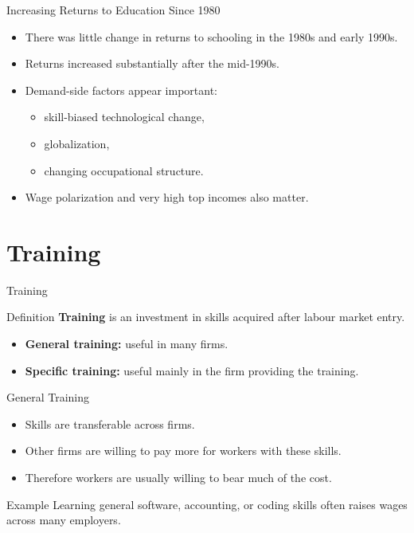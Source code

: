 \documentclass[aspectratio=169]{beamer}
\begin{document}
\begin{frame}{Increasing Returns to Education Since 1980}
\transfade
\begin{itemize}
  \item There was little change in returns to schooling in the 1980s and early 1990s.
  \item Returns increased substantially after the mid-1990s.
  \item Demand-side factors appear important:
  \begin{itemize}
    \item skill-biased technological change,
    \item globalization,
    \item changing occupational structure.
  \end{itemize}
  \item Wage polarization and very high top incomes also matter.
\end{itemize}
\end{frame}

\section{Training}

\begin{frame}{Training}
\transfade
\begin{block}{Definition}
\textbf{Training} is an investment in skills acquired after labour market entry.
\end{block}
\begin{itemize}
  \item \textbf{General training:} useful in many firms.
  \item \textbf{Specific training:} useful mainly in the firm providing the training.
\end{itemize}
\end{frame}

\begin{frame}{General Training}
\transfade
\begin{itemize}
  \item Skills are transferable across firms.
  \item Other firms are willing to pay more for workers with these skills.
  \item Therefore workers are usually willing to bear much of the cost.
\end{itemize}

\begin{exampleblock}{Example}
Learning general software, accounting, or coding skills often raises wages across many employers.
\end{exampleblock}
\end{frame}
\end{document}
